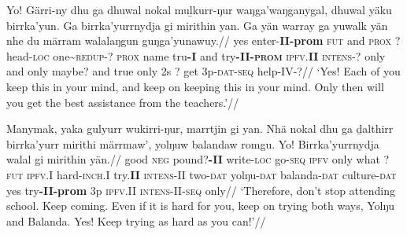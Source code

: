 \documentclass[10pt]{article}
\begin{document}
\a\begingl\gla Yo! Gärri-ny dhu ga dhuwal nokal muḻkurr-ŋur waŋga'waŋganygal, dhuwal yäku birrka'yun. Ga birrka'yurrnydja gi mirithin yan. Ga yän warray ga yuwalk yän nhe du märram walalaŋgun guŋga'yunawuy.//
\glb yes enter-\textbf{II-prom} \textsc{fut} and \textsc{prox} ? head-\textsc{loc} one\textasciitilde{\textsc{redup}}-? \textsc{prox} name tru\textbf{-I} and try\textbf{-II-\textsc{prom}} \textsc{ipfv.\textbf{II}}  \textsc{intens-?} only and only maybe? and true only 2s ? get 3p-\textsc{dat-seq} help-IV-?//
\glft`Yes! Each of you keep this in your mind, and keep on keeping this in your mind. Only then will you get the best assistance from the teachers.'//\endgl

\a\begingl\gla Manymak, yaka gulyurr wukirri-ŋur, marrtjin gi yan. Nhä nokal dhu ga ḏalthirr birrka'yurr mirithi märrmaw', yolŋuw balandaw romgu. Yo! Birrka'yurrnydja walal gi mirithin yän.//
\glb good \textsc{neg} pound?\textbf{-II} write-\textsc{loc} go-\textsc{seq} \textsc{ipfv} only what ? \textsc{fut} \textsc{ipfv.I} hard-\textsc{inch.I} try.\textbf{II} \textsc{intens-II} two\textsc{-dat} yolŋu\textsc{-dat} balanda\textsc{-dat} culture\textsc{-dat} yes try\textbf{-II-prom} 3p \textsc{ipfv.II} \textsc{intens-II-seq} only//
\glft`Therefore, don't stop attending school. Keep coming. Even if it is hard for you, keep on trying both ways, Yolŋu and Balanda. Yes! Keep trying as hard as you can!'//\endgl

\xe
	
\end{document}
